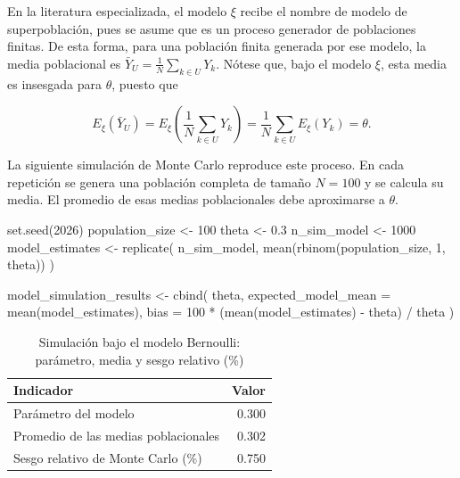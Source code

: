 \documentclass[
  spanish,
  11pt,
  letterpaper,
  oneside,
  open=any]{scrbook}
\newenvironment{Shaded}{\begin{snugshade}}{\end{snugshade}}
\newcommand{\AttributeTok}[1]{\textcolor[rgb]{0.40,0.45,0.13}{#1}}
\newcommand{\DecValTok}[1]{\textcolor[rgb]{0.68,0.00,0.00}{#1}}
\newcommand{\FloatTok}[1]{\textcolor[rgb]{0.68,0.00,0.00}{#1}}
\newcommand{\FunctionTok}[1]{\textcolor[rgb]{0.28,0.35,0.67}{#1}}
\newcommand{\NormalTok}[1]{\textcolor[rgb]{0.00,0.23,0.31}{#1}}
\newcommand{\OtherTok}[1]{\textcolor[rgb]{0.00,0.23,0.31}{#1}}
\newcommand{\SpecialCharTok}[1]{\textcolor[rgb]{0.37,0.37,0.37}{#1}}
\begin{document}
En la literatura especializada, el modelo \(\xi\) recibe el nombre de
modelo de superpoblación, pues se asume que es un proceso generador de
poblaciones finitas. De esta forma, para una población finita generada
por ese modelo, la media poblacional es
\(\bar{Y}_U = \frac{1}{N}\sum_{k \in U}Y_k\). Nótese que, bajo el modelo
\(\xi\), esta media es insesgada para \(\theta\), puesto que

\[
E_{\xi}(\bar{Y}_U) =
E_{\xi}\left(\frac{1}{N}\sum_{k \in U}Y_k\right)
= \frac{1}{N}\sum_{k \in U}E_{\xi}(Y_k)
= \theta.
\]

La siguiente simulación de Monte Carlo reproduce este proceso. En cada
repetición se genera una población completa de tamaño \(N=100\) y se
calcula su media. El promedio de esas medias poblacionales debe
aproximarse a \(\theta\).

\begin{Shaded}
\begin{Highlighting}[]
\FunctionTok{set.seed}\NormalTok{(}\DecValTok{2026}\NormalTok{)}
\NormalTok{population\_size }\OtherTok{\textless{}{-}} \DecValTok{100}
\NormalTok{theta }\OtherTok{\textless{}{-}} \FloatTok{0.3}
\NormalTok{n\_sim\_model }\OtherTok{\textless{}{-}} \DecValTok{1000}
\NormalTok{model\_estimates }\OtherTok{\textless{}{-}} \FunctionTok{replicate}\NormalTok{(}
\NormalTok{  n\_sim\_model,}
  \FunctionTok{mean}\NormalTok{(}\FunctionTok{rbinom}\NormalTok{(population\_size, }\DecValTok{1}\NormalTok{, theta))}
\NormalTok{)}

\NormalTok{model\_simulation\_results }\OtherTok{\textless{}{-}} \FunctionTok{cbind}\NormalTok{(}
\NormalTok{  theta,}
  \AttributeTok{expected\_model\_mean =} \FunctionTok{mean}\NormalTok{(model\_estimates),}
  \AttributeTok{bias =} \DecValTok{100} \SpecialCharTok{*}\NormalTok{ (}\FunctionTok{mean}\NormalTok{(model\_estimates) }\SpecialCharTok{{-}}\NormalTok{ theta) }\SpecialCharTok{/}\NormalTok{ theta}
\NormalTok{)}
\end{Highlighting}
\end{Shaded}

{

\begin{longtable}[]{@{}lr@{}}

\caption{\label{tbl-ap2-model-simulation}Simulación bajo el modelo
Bernoulli: parámetro, media y sesgo relativo (\%)}

\tabularnewline

\toprule\noalign{}
Indicador & Valor \\
\midrule\noalign{}
\endhead
\bottomrule\noalign{}
\endlastfoot
Parámetro del modelo & 0.300 \\
Promedio de las medias poblacionales & 0.302 \\
Sesgo relativo de Monte Carlo (\%) & 0.750 \\

\end{longtable}

}
\end{document}
